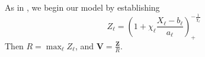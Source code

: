 As in \cite{trubeypg}, we begin our model by establishing 
    \[
        Z_{\ell} = \left(1 + \chi_{\ell}\frac{X_{\ell} - b_{\ell}}{a_{\ell}}\right)_{+}^{-\frac{1}{\chi_{\ell}}}
    \]
    Then $R = \max_{\ell}Z_{\ell}$, and $\bm{V} = \frac{\bm{Z}}{R}$.

    







